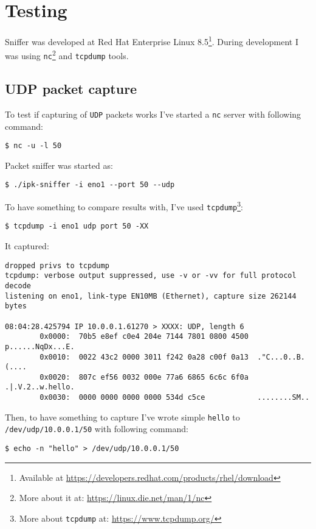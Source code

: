 \documentclass[11pt, a4paper]{article}
\begin{document}
    \section{Testing}
        Sniffer was developed at Red Hat Enterprise Linux 8.5\footnote{Available at \url{https://developers.redhat.com/products/rhel/download}}.
        During development I was using \texttt{nc}\footnote{More about it at: \url{https://linux.die.net/man/1/nc}} and \texttt{tcpdump} tools.
        \subsection{UDP packet capture}
            To test if capturing of \texttt{UDP} packets works I've started a \texttt{nc} server with following command:
            \begin{verbatim}
$ nc -u -l 50
            \end{verbatim}
            Packet sniffer was started as:
            \begin{verbatim}
$ ./ipk-sniffer -i eno1 --port 50 --udp
            \end{verbatim}
            To have something to compare results with, I've used \texttt{tcpdump}\footnote{More about \texttt{tcpdump} at: \url{https://www.tcpdump.org/}}:
            \begin{verbatim}
$ tcpdump -i eno1 udp port 50 -XX
            \end{verbatim}
            It captured:
            \begin{verbatim}
dropped privs to tcpdump
tcpdump: verbose output suppressed, use -v or -vv for full protocol decode
listening on eno1, link-type EN10MB (Ethernet), capture size 262144 bytes

08:04:28.425794 IP 10.0.0.1.61270 > XXXX: UDP, length 6
        0x0000:  70b5 e8ef c0e4 204e 7144 7801 0800 4500  p......NqDx...E.
        0x0010:  0022 43c2 0000 3011 f242 0a28 c00f 0a13  ."C...0..B.(....
        0x0020:  807c ef56 0032 000e 77a6 6865 6c6c 6f0a  .|.V.2..w.hello.
        0x0030:  0000 0000 0000 0000 534d c5ce            ........SM..
            \end{verbatim}
            Then, to have something to capture I've wrote simple \texttt{hello} to \texttt{/dev/udp/10.0.0.1/50} with following command:
            \begin{verbatim}
$ echo -n "hello" > /dev/udp/10.0.0.1/50
            \end{verbatim}
            
\end{document}

